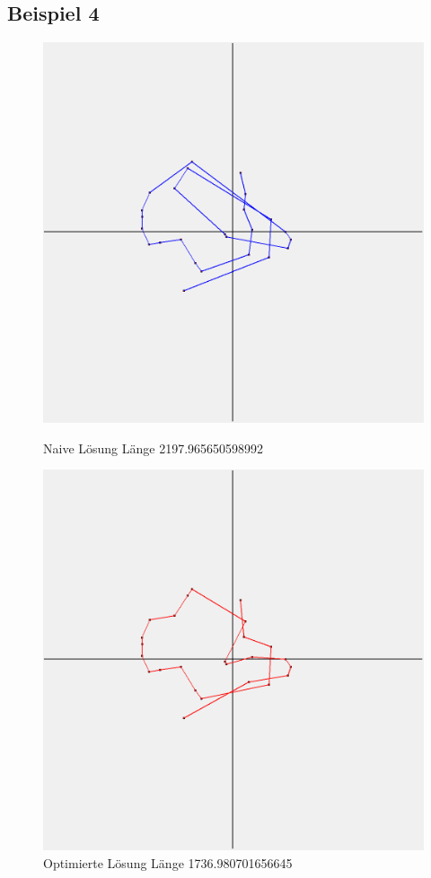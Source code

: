 \subsection{Beispiel 4}\label{subsec:beispiel-4}
\begin{figure}[h]
    \centering
    \begin{minipage}[b]{0.5\textwidth}
        \includegraphics[width=\textwidth]{naivwenigerkrumm4}
        \caption{Naive Lösung Länge 2197.965650598992}
    \end{minipage}
    \hfill
    \begin{minipage}[b]{0.5\textwidth}
        \includegraphics[width=\textwidth]{optimizedwenigerkrumm4}
        \caption{Optimierte Lösung Länge 1736.980701656645}
    \end{minipage}\label{fig:wenigerkrumm4}
\end{figure}
